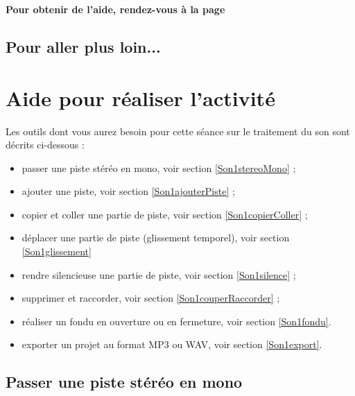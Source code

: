 \textbf{Pour obtenir de l'aide, rendez-vous à la page \pageref{Son5eOutils}}

\vfill



\subsection{Pour aller plus loin...}

\vfill

\phantom{rien} 

\newpage


\section{Aide pour réaliser l'activité}\label{Son5eOutils}

Les outils dont vous aurez besoin pour cette séance sur le traitement du son sont décrits ci-dessous :

\begin{itemize}   
\item passer une piste stéréo en mono, voir section \vref{Son1stereoMono} ;
\item ajouter une piste, voir section \vref{Son1ajouterPiste} ;
\item copier et coller une partie de piste, voir section \vref{Son1copierColler} ;
\item déplacer une partie de piste (glissement temporel), voir section \vref{Son1glissement}
\item rendre silencieuse une partie de piste, voir section \vref{Son1silence} ;
\item supprimer et raccorder, voir section \vref{Son1couperRaccorder} ;
\item réaliser un fondu en ouverture ou en fermeture, voir section \vref{Son1fondu}.
\item exporter un projet au format MP3 ou WAV, voir section \vref{Son1export}.
\end{itemize} 



\subsection{Passer une piste stéréo en mono}\label{Son1stereoMono} 

